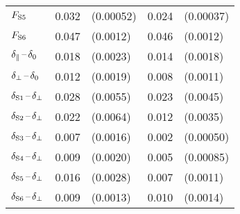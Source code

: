 \begin{table}[htbp]
\begin{tabular}{lllll}
    $\FS[5]$        &  0.032  &  (0.00052)                              &  0.024  &  (0.00037)                            \\
    $\FS[6]$        &  0.047  &  (0.0012)                               &  0.046  &  (0.0012)                             \\
    \hline
    $\delparzero$   &  0.018  &  (0.0023)                               &  0.014  &  (0.0018)                             \\
    $\delperpzero$  &  0.012  &  (0.0019)                               &  0.008  &  (0.0011)                             \\
    $\delSperp[1]$  &  0.028  &  (0.0055)                               &  0.023  &  (0.0045)                             \\
    $\delSperp[2]$  &  0.022  &  (0.0064)                               &  0.012  &  (0.0035)                             \\
    $\delSperp[3]$  &  0.007  &  (0.0016)                               &  0.002  &  (0.00050)                            \\
    $\delSperp[4]$  &  0.009  &  (0.0020)                               &  0.005  &  (0.00085)                            \\
    $\delSperp[5]$  &  0.016  &  (0.0028)                               &  0.007  &  (0.0011)                             \\
    $\delSperp[6]$  &  0.009  &  (0.0013)                               &  0.010  &  (0.0014)                             \\
    \hline
  \end{tabular}
\end{table}

